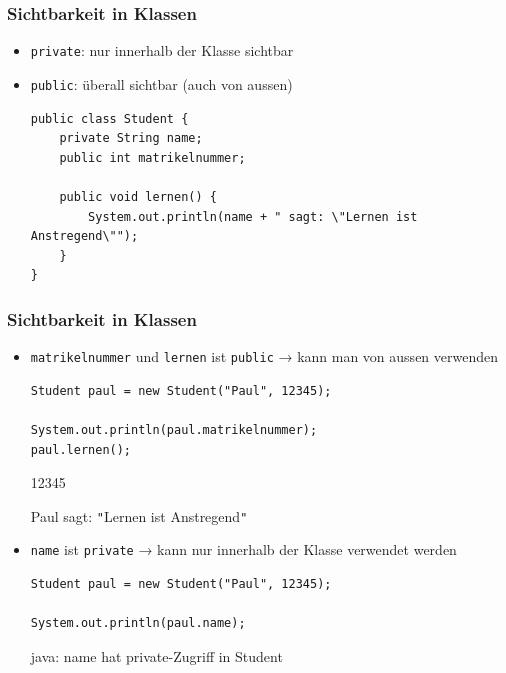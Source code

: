 \documentclass{../../presentation}
\begin{document}
\begin{frame}[fragile]
	\frametitle{Sichtbarkeit in Klassen}
	\pause
	\begin{itemize}
		\item \texttt{private}: nur innerhalb der Klasse sichtbar
		      \pause
		\item \texttt{public}: überall sichtbar (auch von aussen)
		      \pause
		      \begin{verbatim}
public class Student {
    private String name;
    public int matrikelnummer;

    public void lernen() {
        System.out.println(name + " sagt: \"Lernen ist Anstregend\"");
    }
}
	\end{verbatim}
	\end{itemize}
\end{frame}

\begin{frame}[fragile]
	\frametitle{Sichtbarkeit in Klassen}
	\pause
	\begin{itemize}
		\item\texttt{matrikelnummer} und \texttt{lernen} ist \texttt{public} → kann man von aussen verwenden
		      \begin{verbatim}
Student paul = new Student("Paul", 12345);

System.out.println(paul.matrikelnummer);
paul.lernen();
  \end{verbatim}
		      \pause
		      {\begin{ausgabe}
				      12345

				      Paul sagt: \texttt{"}Lernen ist Anstregend\texttt{"}
			      \end{ausgabe}}
		      \pause
		\item \texttt{name} ist \texttt{private} → kann nur innerhalb der Klasse verwendet werden
		      \begin{verbatim}
Student paul = new Student("Paul", 12345);

System.out.println(paul.name);
  \end{verbatim}
		      \pause
		      \begin{ausgabe}
			      \alert{java: name hat private-Zugriff in Student}
		      \end{ausgabe}
	\end{itemize}
\end{frame}
\end{document}
